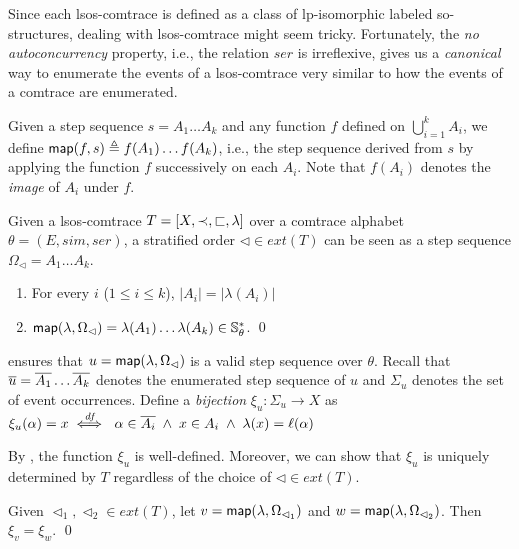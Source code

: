\documentclass{llncs}
\begin{document}
Since each lsos-comtrace is defined as a class of lp-isomorphic labeled so-structures, dealing with lsos-comtrace might seem tricky. Fortunately, the \emph{no autoconcurrency} property, i.e., the relation $ser$ is irreflexive, gives us a \emph{canonical} way to enumerate the events of a lsos-comtrace very similar to how the events of a comtrace are enumerated.

Given a step sequence $s=A_{1}\ldots A_{k}$ and any function $f$ defined on $\bigcup_{i=1}^k A_i$, we define $\mathsf{map}(f,s)\triangleq f(A_{1})\ldots f(A_{k})$, i.e., the step sequence derived from $s$ by applying the function $f$ successively on each $A_{i}$. Note that $f(A_{i})$ denotes the \emph{image} of $A_i$ under $f$.

Given a lsos-comtrace $T=\left[ X,\prec,\sqsubset,\lambda \right]$  over a comtrace alphabet $\theta=(E,sim,ser)$,  a stratified order $\lhd\in ext(T)$ can be seen as a step sequence $\Omega_{\lhd}=A_{1}\ldots A_{k}$.

\begin{proposition}  
\begin{enumerate}
\item For every $i$ ($1\le i \le k$), $|A_{i}|=|\lambda(A_{i})|$
\item $\mathsf{map}(\lambda,\Omega_{\lhd}) = \lambda(A_{1})\ldots \lambda(A_{k}) \in \mathbb{S}_{\theta}^{*}$. \qed
\end{enumerate}
\label{prop:validss}
\end{proposition}


  ensures that  $u=\mathsf{map}(\lambda,\Omega_{\lhd})$ is a valid step sequence over $\theta$. Recall that $\overline{u}=\overline{A_{1}}\ldots \overline{A_{k}}$ denotes the enumerated step sequence of $u$ and $\Sigma_{u}$ denotes the set of event occurrences. Define a  \emph{bijection} $\xi_{u}:\Sigma_{u}\rightarrow X$ as\\
\mbox{\hspace{2.7cm}}$\xi_{u}(\alpha)  = x \stackrel{\textit{\scriptsize{df}}}{\iff}\  \alpha \in \overline{A_{i}} \;\wedge\; x\in A_{i} \;\wedge\; \lambda(x) = \ell(\alpha)$\smallskip

By , the function $\xi_{u}$ is well-defined.  Moreover, we can show that $\xi_{u}$ is uniquely determined by $T$ regardless of the choice of $\lhd\in ext(T)$.

\begin{proposition} Given $\lhd_{1},\lhd_{2}\in ext(T)$, let $v  = \mathsf{map}(\lambda,\Omega_{\lhd_{1}})$ and $w = \mathsf{map}(\lambda,\Omega_{\lhd_{2}})$. Then $\xi_{v} = \xi_{w}$. \qed
\label{prop:uniquexi}
\end{proposition}
\end{document}
